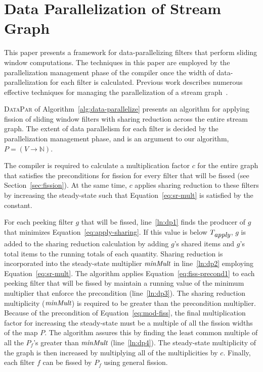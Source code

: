 \section{Data Parallelization of Stream Graph}
\label{sec:data-par}

This paper presents a framework for data-parallelizing filters that
perform sliding window computations.  The techniques in this paper are
employed by the parallelization management phase of the compiler once
the width of data-parallelization for each filter is calculated.
Previous work describes numerous effective techniques for managing the
parallelization of a stream
graph~\cite{kudlur08,gordon-asplos06,flextream,udupa09-gpu,liao06brook}.

\textsc{DataPar} of Algorithm~\ref{alg:data-parallelize} presents an
algorithm for applying fission of sliding window filters with sharing
reduction across the entire stream graph.  The extent of data
parallelism for each filter is decided by the parallelization
management phase, and is an argument to our algorithm, $P=(V
\rightarrow \mathbb{N})$. 

The compiler is required to calculate a multiplication factor $c$ for
the entire graph that satisfies the preconditions for fission for
every filter that will be fissed (see Section~\ref{sec:fission}).  At
the same time, $c$ applies sharing reduction to these filters by
increasing the steady-state such that Equation~\ref{eq:sr-mult} is
satisfied by the constant.

For each peeking filter $g$ that will be fissed, line~\ref{ln:dp1}
finds the producer of $g$ that minimizes
Equation~\ref{eq:apply-sharing}.  If this value is below
$T_{\mbox{\it apply}}$, $g$ is added to the sharing reduction calculation by
adding $g$'s shared items and $g$'s total items to the running totals
of each quantity.  Sharing reduction is incorporated into the
steady-state multiplier $\mbox{\it minMult}$ in line~\ref{ln:dp2} employing
Equation~\ref{eq:sr-mult}.  The algorithm applies
Equation~\ref{eq:fiss-precond1} to each peeking filter that will be
fissed by maintain a running value of the minimum multiplier that
enforce the precondition (line~\ref{ln:dp3}).  The sharing reduction
multiplicity ($\mbox{\it minMult}$) is required to be greater than the
precondition multiplier.  Because of the precondition of
Equation~\ref{eq:mod-fiss}, the final multiplication factor for
increasing the steady-state must be a multiple of all the fission
widths of the map $P$. The algorithm assures
this by finding the least common multiple of all the $P_f$'s greater
than $\mbox{\it minMult}$ (line~\ref{ln:dp4}).  The steady-state
multiplicity of the graph is then increased by multiplying all of the
multiplicities by $c$.  Finally, each filter $f$ can be fissed by
$P_f$ using general fission.

